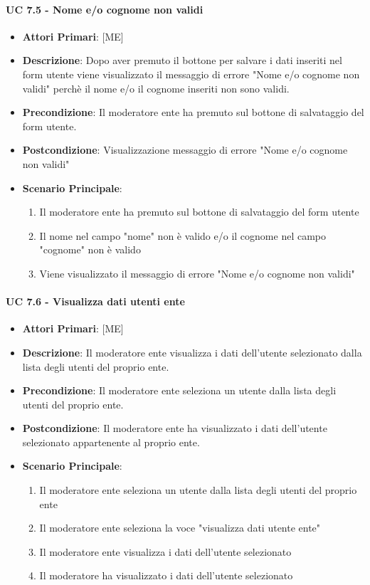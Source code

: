 			\paragraph{UC 7.5 - Nome e/o cognome non validi}
			\begin{itemize}
				\item \textbf{Attori Primari}: [ME]
				\item \textbf{Descrizione}: Dopo aver premuto il bottone per salvare i dati inseriti nel form utente viene visualizzato il messaggio di errore "Nome e/o cognome non validi" perchè il nome e/o il cognome inseriti non sono validi. 
				\item \textbf{Precondizione}: Il moderatore ente ha premuto sul bottone di salvataggio del form utente.
				\item \textbf{Postcondizione}: Visualizzazione messaggio di errore "Nome e/o cognome non validi"
				\item \textbf{Scenario Principale}:
				\begin{enumerate}
					\item{Il moderatore ente ha premuto sul bottone di salvataggio del form utente}
					\item{Il nome nel campo "nome" non è valido e/o il cognome nel campo "cognome" non è valido}
					\item{Viene visualizzato il messaggio di errore "Nome e/o cognome non validi"}
				\end{enumerate}	
			\end{itemize}
			
			\paragraph{UC 7.6 - Visualizza dati utenti ente}
			\begin{itemize}
				\item \textbf{Attori Primari}: [ME]
				\item \textbf{Descrizione}: Il moderatore ente visualizza i dati dell'utente selezionato dalla lista degli utenti del proprio ente.
				\item \textbf{Precondizione}: Il moderatore ente seleziona un utente dalla lista degli utenti del proprio ente.
				\item \textbf{Postcondizione}: Il moderatore ente ha visualizzato i dati dell'utente selezionato appartenente al proprio ente.
				\item \textbf{Scenario Principale}:
				\begin{enumerate}
					\item{Il moderatore ente seleziona un utente dalla lista degli utenti del proprio ente}
					\item{Il moderatore ente seleziona la voce "visualizza dati utente ente"}
					\item{Il moderatore ente visualizza i dati dell'utente selezionato}
					\item{Il moderatore ha visualizzato i dati dell'utente selezionato}
				\end{enumerate}
			\end{itemize}
			
